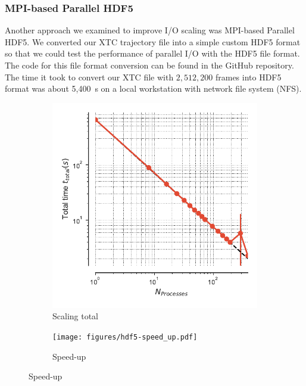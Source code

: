 \subsubsection{MPI-based Parallel HDF5}
\label{HDF5}

Another approach we examined to improve I/O scaling was MPI-based Parallel HDF5. 
We converted our XTC trajectory file into a simple custom HDF5 format so that we could test the performance of parallel I/O with the HDF5 file format.
The code for this file format conversion can be found in the GitHub repository.
The time it took to convert our XTC file with $2,512,200$ frames into HDF5 format was about 5,400~s on a local workstation with network file system (NFS).

\begin{figure}[!htb]
  \centering
  \begin{subfigure}{.49\textwidth}
    \includegraphics[width=\linewidth]{figures/hdf5-t_total.pdf}
    \caption{Scaling total}
    \label{fig:MPIscaling-hdf5}
  \end{subfigure}
  \hfill
  \begin{subfigure}{.49\textwidth}
    \texttt{[image: figures/hdf5-speed\_up.pdf]}
    \caption{Speed-up}
    \label{fig:MPIspeedup-hdf5}
  \end{subfigure}
  \bigskip


\end{figure}
